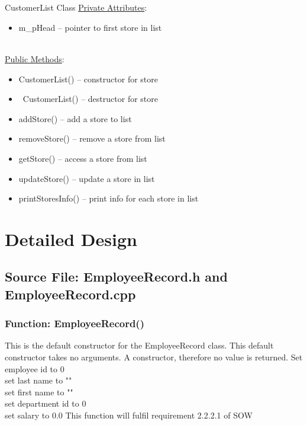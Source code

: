 \documentclass[12pt]{article}%
\newcounter{subsubsubsection}[subsubsection]
\begin{document}
\hfill\\
\hfill\\
CustomerList Class
\underline{Private Attributes}:
\begin{itemize}
    \item m\_pHead -- pointer to first store in list
    \end{itemize}
    \hfill\\
\underline{Public Methods}:
\begin{itemize}
    \item CustomerList() -- constructor for store
    \item ~CustomerList() -- destructor for store
    \item addStore() -- add a store to list
    \item removeStore() -- remove a store from list
    \item getStore() -- access a store from list
    \item updateStore() -- update a store in list
    \item printStoresInfo() -- print info for each store in list
\end{itemize}


\section{Detailed Design}
\subsection{Source File: EmployeeRecord.h and EmployeeRecord.cpp}
\subsubsection{Function: EmployeeRecord()}
This is the default constructor for the EmployeeRecord class.
This default constructor takes no arguments.
A constructor, therefore no value is returned.
Set employee id to 0 \\
set last name to "" \\
set first name to "" \\
set department id to 0 \\
set salary to 0.0
This function will fulfil requirement 2.2.2.1 of SOW
\end{document}
